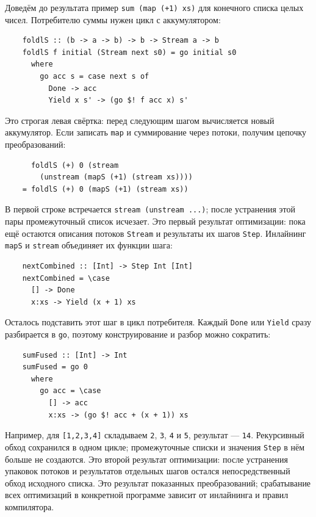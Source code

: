 \begin{samepage}
Доведём до результата пример \texttt{sum (map (+1) xs)} для конечного списка целых чисел.
Потребителю суммы нужен цикл с аккумулятором:
\begin{verbatim}
    foldlS :: (b -> a -> b) -> b -> Stream a -> b
    foldlS f initial (Stream next s0) = go initial s0
      where
        go acc s = case next s of
          Done -> acc
          Yield x s' -> (go $! f acc x) s'
\end{verbatim}
\par\end{samepage}
Это строгая левая свёртка: перед следующим шагом вычисляется новый аккумулятор.
Если записать \texttt{map} и суммирование через потоки, получим цепочку преобразований:
\begin{verbatim}
      foldlS (+) 0 (stream
        (unstream (mapS (+1) (stream xs))))
    = foldlS (+) 0 (mapS (+1) (stream xs))
\end{verbatim}
В первой строке встречается \texttt{stream (unstream ...)}; после устранения этой пары промежуточный список исчезает.
Это первый результат оптимизации: пока ещё остаются описания потоков \texttt{Stream} и результаты их шагов \texttt{Step}.
Инлайнинг \texttt{mapS} и \texttt{stream} объединяет их функции шага:
\begin{verbatim}
    nextCombined :: [Int] -> Step Int [Int]
    nextCombined = \case
      [] -> Done
      x:xs -> Yield (x + 1) xs
\end{verbatim}
\begin{samepage}
Осталось подставить этот шаг в цикл потребителя.
Каждый \texttt{Done} или \texttt{Yield} сразу разбирается в \texttt{go}, поэтому конструирование и разбор можно сократить:
\begin{verbatim}
    sumFused :: [Int] -> Int
    sumFused = go 0
      where
        go acc = \case
          [] -> acc
          x:xs -> (go $! acc + (x + 1)) xs
\end{verbatim}
\par\end{samepage}
Например, для \texttt{[1,2,3,4]} складываем \texttt{2}, \texttt{3}, \texttt{4} и \texttt{5}, результат --- \texttt{14}.
Рекурсивный обход сохранился в одном цикле; промежуточные списки и значения \texttt{Step} в нём больше не создаются.
Это второй результат оптимизации: после устранения упаковок потоков и результатов отдельных шагов остался непосредственный обход исходного списка.
Это результат показанных преобразований; срабатывание всех оптимизаций в конкретной программе зависит от инлайнинга и правил компилятора.

